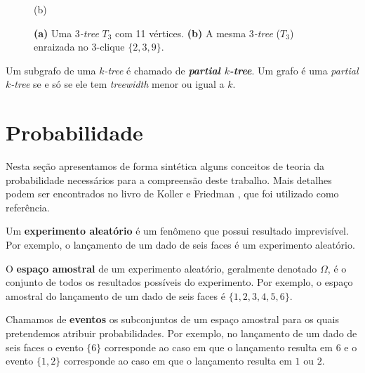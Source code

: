 \begin{definition}
\begin{figure}
\begin{minipage}{0.5\textwidth}

      (b)
    \end{minipage}

    \caption{
      \textbf{(a)} Uma \emph{$3$-tree} $T_3$ com 11 vértices.
      \textbf{(b)} A mesma \emph{$3$-tree} ($T_3$) enraizada no $3$-clique $\{2, 3, 9\}$.
    }
    \label{fig:rootedktree}
  \end{figure}
\end{definition}

\begin{definition}
  \cite{bodlaender} Um subgrafo de uma \emph{$k$-tree} é chamado de \textbf{\emph{partial $k$-tree}}. Um grafo é uma \emph{partial $k$-tree} se e só se ele tem \emph{treewidth} menor ou igual a $k$.
\end{definition}

\section{Probabilidade}

Nesta seção apresentamos de forma sintética alguns conceitos de teoria da probabilidade necessários para a compreensão deste trabalho. Mais detalhes podem ser encontrados no livro de Koller e Friedman \cite{koller}, que foi utilizado como referência.

\vspace{2em}

Um \textbf{experimento aleatório} é um fenômeno que possui resultado imprevisível. Por exemplo, o lançamento de um dado de seis faces é um experimento aleatório.

O \textbf{espaço amostral} de um experimento aleatório, geralmente denotado $\Omega$, é o conjunto de todos os resultados possíveis do experimento. Por exemplo, o espaço amostral do lançamento de um dado de seis faces é $\{1, 2, 3, 4, 5, 6\}$.

Chamamos de \textbf{eventos} os subconjuntos de um espaço amostral para os quais pretendemos atribuir probabilidades. Por exemplo, no lançamento de um dado de seis faces o evento $\{6\}$ corresponde ao caso em que o lançamento resulta em $6$ e o evento $\{1, 2\}$ corresponde ao caso em que o lançamento resulta em $1$ ou $2$.

